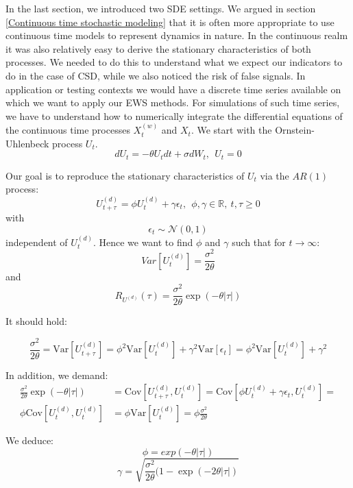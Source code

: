 \documentclass[%
thesis=student,%
coverpage=false,%
titlepage=false,%
headmarks=true, %
english,%
font=libertine, %
math=newpxtx, %
BCOR=5mm,%
coverBCOR=11mm%
]{tumbook}
\begin{document}
In the last section, we introduced two SDE settings. We argued in section \ref{Continuous time stochastic modeling} that it is often more appropriate to use continuous time models to represent dynamics in nature. In the continuous realm it was also relatively easy to derive the stationary characteristics of both processes. We needed to do this to understand what we expect our indicators to do in the case of CSD, while we also noticed the risk of false signals. 
In application or testing contexts we would have a discrete time series available on which we want to apply our EWS methods. For simulations of such time series, we have to understand how to numerically integrate the differential equations of the continuous time processes $X_{t}^{(w)}$ and $X_{t}$. We start with the Ornstein-Uhlenbeck process $U_{t}$.
\[
dU_{t} = -\theta U_{t}dt + \sigma dW_{t}, \ \ U_{t} = 0
\]

Our goal is to reproduce the stationary characteristics of $U_{t}$  via the $AR(1)$ process:
\[
     U_{t+\tau}^{(d)} = \phi U_{t} ^{(d)}+ \gamma \epsilon_{t}, \ \ \phi, \gamma \in \mathbb{R}, \ t,\tau \geq 0
\]
with 
\[
\epsilon_{t} \sim \mathcal{N}(0,1)
\]
independent of $U_{t}^{(d)}$.
Hence we want to find $\phi$ and $\gamma$ such that for $t \rightarrow \infty$:
\[
Var[U_{t}^{(d)}] = \frac{\sigma^{2}}{2\theta}
\]
and 
\[
R_{U^{(d)}}(\tau) = \frac{\sigma ^2}{2\theta}\exp(-\theta\lvert \tau \rvert)
\]

It should hold:

\begin{equation*}
    \frac{\sigma^2}{2\theta} = \text{Var}[U_{t+\tau} ^{(d)}] = \phi ^2 \text{Var}[U_{t} ^{(d)}] + \gamma ^2 \text{Var}[\epsilon_{t}] = \phi ^2 \text{Var}[U_{t} ^{(d)}] + \gamma ^2
\end{equation*}

In addition, we demand: 
  \begin{align*} 
      \frac{\sigma ^2}{2\theta}\exp(-\theta\lvert \tau \rvert) &= \text{Cov}[U_{t+\tau} ^{(d)},U_{t} ^{(d)}] = \text{Cov}[\phi U_{t} ^{(d)} + \gamma \epsilon_{t}, U_{t}^{(d)}] = \\
      \phi\text{Cov}[U_{t}^{(d)},U_{t}^{(d)}] &= \phi \text{Var}[U_{t}^{(d)}] = \phi \frac{\sigma^2}{2\theta}
  \end{align*}




We deduce: 
    \[
        \phi = exp(-\theta \lvert \tau \rvert)
    \]
    \[
        \gamma = \sqrt{\frac{\sigma^{2}}{2\theta}(1-\exp(-2\theta \lvert \tau \rvert)}
    \]
\end{document}
